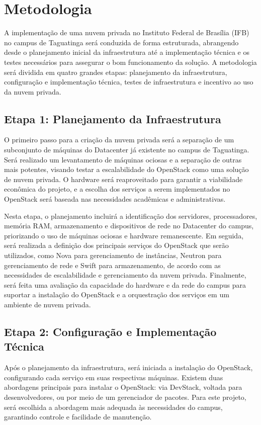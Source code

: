\chapter{Metodologia}

A implementação de uma nuvem privada no Instituto Federal de Brasília (IFB) no campus de Taguatinga será conduzida de forma estruturada, abrangendo desde o planejamento inicial da infraestrutura até a implementação técnica e os testes necessários para assegurar o bom funcionamento da solução. A metodologia será dividida em quatro grandes etapas: planejamento da infraestrutura, configuração e implementação técnica, testes de infraestrutura e incentivo ao uso da nuvem privada.

\section{Etapa 1: Planejamento da Infraestrutura}

O primeiro passo para a criação da nuvem privada será a separação de um subconjunto de máquinas do Datacenter já existente no campus de Taguatinga. Será realizado um levantamento de máquinas ociosas e a separação de outras mais potentes, visando testar a escalabilidade do OpenStack como uma solução de nuvem privada. O hardware será reaproveitado para garantir a viabilidade econômica do projeto, e a escolha dos serviços a serem implementados no OpenStack será baseada nas necessidades acadêmicas e administrativas.

Nesta etapa, o planejamento incluirá a identificação dos servidores, processadores, memória RAM, armazenamento e dispositivos de rede no Datacenter do campus, priorizando o uso de máquinas ociosas e hardware remanescente. Em seguida, será realizada a definição dos principais serviços do OpenStack que serão utilizados, como Nova para gerenciamento de instâncias, Neutron para gerenciamento de rede e Swift para armazenamento, de acordo com as necessidades de escalabilidade e gerenciamento da nuvem privada. Finalmente, será feita uma avaliação da capacidade do hardware e da rede do campus para suportar a instalação do OpenStack e a orquestração dos serviços em um ambiente de nuvem privada.

\section{Etapa 2: Configuração e Implementação Técnica}

Após o planejamento da infraestrutura, será iniciada a instalação do OpenStack, configurando cada serviço em suas respectivas máquinas. Existem duas abordagens principais para instalar o OpenStack: via DevStack, voltada para desenvolvedores, ou por meio de um gerenciador de pacotes. Para este projeto, será escolhida a abordagem mais adequada às necessidades do campus, garantindo controle e facilidade de manutenção.

